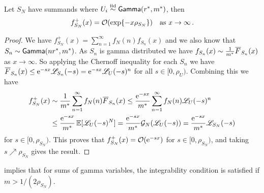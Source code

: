 \begin{proposition}\label{prop:ExpBound}
Let $S_N$ have summands where $U_i \overset{\smash{\mathrm{iid}}}{\sim} \mathsf{Gamma}(r^*, m^*)$, then
$$
f_{S_N}^+(x) = {\mathcal{O}}(\exp\{- x \rho_{S_N}\}) \quad \text{as } x \to \infty \,.
$$
\end{proposition}
\begin{proof}
We have $f_{S_N}^+(x) = \sum_{n=1}^\infty f_N(n) f_{S_n}(x)$ and we also know that $S_n \sim \mathsf{Gamma}(n r^*, m^*)$. As $S_n$ is gamma distributed we have $f_{S_n}(x) \sim \frac{1}{m^*} \Ftail_{S_n}(x)$ as $x \to \infty$.
So applying the Chernoff inequality for each $S_n$ we have
$ \Ftail_{S_n}(x) \le \e^{-s x} \LTsub{S_n}(-s)  = \e^{-s x} \LTsub{U}(-s)^n $
for all $s \in [0, \rho_U)$. Combining this we have
\begin{align*}
f_{S_N}^+(x)
&\sim \frac{1}{m^*} \sum_{n=1}^\infty f_N(n) \Ftail_{S_n}(x)
\le \frac{\e^{-s x}}{m^*} \sum_{n=1}^\infty f_N(n) \LTsub{U}(-s)^n \\
&\le \frac{\e^{-s x}}{m^*} \Exp[ \LTsub{U}(-s)^N ] = \frac{\e^{-s x}}{m^*} \PGF_N( \LTsub{U}(-s) ) = \frac{\e^{-s x}}{m^*} \LTsub{S_N}(-s)
\end{align*}
for $s \in [0, \rho_{S_N})$. This proves that $f_{S_N}^+(x) = {\mathcal{O}}( \mathrm{e}^{-s x} )$ for $s \in [0, \rho_{S_N})$, and taking $s \nearrow \rho_{S_N}$ gives the result.
\end{proof}

 implies that for sums of gamma variables, the integrability condition is satisfied if $m>1/(2 \rho_{S_N})$.


